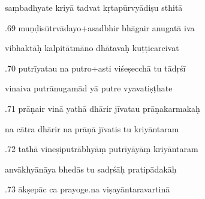 \documentclass[article,12pt,a4paper]{memoir}%
\newcounter{parCount}
\begin{document}
	  
	  \pstart \leavevmode%
	saṃbadhyate kriyā tadvat kṛtapūrvyādiṣu sthitā 
	{}
	\pend%
      

	  
	  \pstart {}.69 muṇḍisūtrvādayo+asadbhir bhāgair anugatā iva 
	{}
	\pend%
      

	  
	  \pstart \leavevmode%
	vibhaktāḥ kalpitātmāno dhātavaḥ kuṭṭicarcivat 
	{}
	\pend%
      

	  
	  \pstart {}.70 putrīyatau na putro+asti viśeṣecchā tu tādṛśī 
	{}
	\pend%
      

	  
	  \pstart \leavevmode%
	vinaiva putrānugamād yā putre vyavatiṣṭhate 
	{}
	\pend%
      

	  
	  \pstart {}.71 prāṇair vinā yathā dhārir jīvatau prāṇakarmakaḥ 
	{}
	\pend%
      

	  
	  \pstart \leavevmode%
	na cātra dhārir na prāṇā jīvatis tu kriyāntaram 
	{}
	\pend%
      

	  
	  \pstart {}.72 tathā vineṣiputrābhyāṃ putrīyāyāṃ kriyāntaram 
	{}
	\pend%
      

	  
	  \pstart \leavevmode%
	anvākhyānāya bhedās tu sadṛśāḥ pratipādakāḥ 
	{}
	\pend%
      

	  
	  \pstart {}.73 ākṣepāc ca prayoge.na viṣayāntaravartinā 
	{}
	\pend%
      
\end{document}
